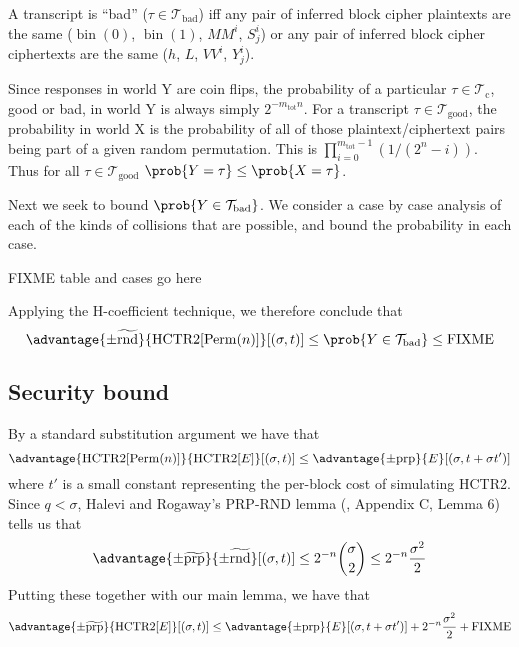 \documentclass[letterpaper,11pt]{article}
\newcommand*{\MM}{\mathit{MM}}
\newcommand*{\mtot}{m_{\mathrm{tot}}}
\newcommand*{\Tb}{\mathcal{T}_\mathrm{bad}}
\newcommand*{\Tc}{\mathcal{T}_\mathrm{c}}
\newcommand*{\Tg}{\mathcal{T}_\mathrm{good}}
\newcommand*{\VV}{\mathit{VV}}
\DeclareMathOperator{\fromint}{bin}
\DeclareMathOperator{\HCTR}{HCTR2}
\DeclareMathOperator{\Perm}{Perm}
\begin{document}
A transcript is ``bad'' (\(\tau \in \Tb\)) iff any pair of 
inferred block cipher plaintexts are the same
(\(\fromint(0)\), \(\fromint(1)\), \(\MM^i\), \(S_j^i\))
or any pair of inferred block cipher ciphertexts are the same
(\(h\), \(L\), \(\VV^i\), \(Y_j^i\)). 

Since responses in world Y are coin flips,
the probability of a 
particular \(\tau \in \Tc\), good or bad,
in world Y is always simply \(2^{-\mtot n}\).
For a transcript \(\tau \in \Tg\),
the probability in world X
is the probability of all of those plaintext/ciphertext
pairs being part of a given random permutation.
This is 
\(\prod_{i=0}^{\mtot -1}(1/(2^n - i))\).
Thus for all \(\tau \in \Tg\)
\(\prob{Y = \tau} \leq \prob{X = \tau}\). 

Next we seek to bound \(\prob{Y \in \Tb}\).
We consider a case by case analysis of
each of the kinds of collisions that are
possible, and bound the probability in each case.

FIXME table and cases go here

Applying the H-coefficient technique, we therefore conclude that
\begin{displaymath}
    \advantage{\pm\widetilde{\mathrm{rnd}}}{\HCTR[\Perm(n)]}[(\sigma, t)] \leq
    \prob{Y \in \Tb} \leq \mathrm{FIXME}
\end{displaymath}

\subsection{Security bound}
By a standard substitution argument we have that
\begin{displaymath}
    \advantage{\HCTR[\Perm(n)]}{\HCTR[E]}[(\sigma, t)] \leq \advantage{\pm \mathrm{prp}}{E}[(\sigma, t + \sigma t')]
\end{displaymath}
where \(t'\) is a small constant
representing the per-block cost of simulating HCTR2.
Since \(q < \sigma\), Halevi and Rogaway's PRP-RND lemma
(\cite{cmc}, Appendix C, Lemma 6) tells us that
\begin{displaymath}
    \advantage{\pm \widetilde{\mathrm{prp}}}{\pm\widetilde{\mathrm{rnd}}}[(\sigma, t)] \leq 2^{-n}\binom{\sigma}{2} \leq 2^{-n}\frac{\sigma^2}{2}
\end{displaymath}
Putting these together with our main lemma, we have that
\begin{displaymath}
    \advantage{\pm \widetilde{\mathrm{prp}}}{\HCTR[E]}[(\sigma, t)] \leq \advantage{\pm \mathrm{prp}}{E}[(\sigma, t + \sigma t')]
    + 2^{-n}\frac{\sigma^2}{2}
    + \mathrm{FIXME}
\end{displaymath}
\end{document}
